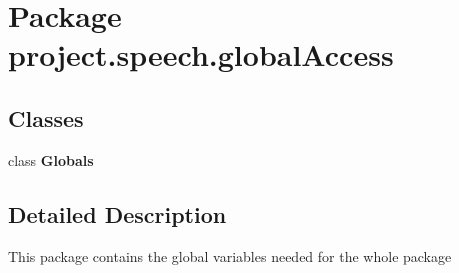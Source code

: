 \section{Package project.\+speech.\+global\+Access}
\label{namespaceproject_1_1speech_1_1global_access}
\subsection*{Classes}
\begin{DoxyCompactItemize}
\item 
class {\bf Globals}
\end{DoxyCompactItemize}


\subsection{Detailed Description}
This package contains the global variables needed for the whole package 